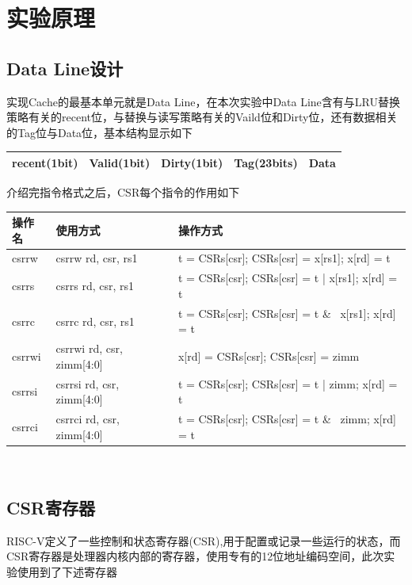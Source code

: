 
\section{实验原理}
\subsection{Data Line设计}
实现Cache的最基本单元就是Data Line，在本次实验中Data Line含有与LRU替换策略有关的recent位，与替换与读写策略有关的Vaild位和Dirty位，还有数据相关的Tag位与Data位，基本结构显示如下\\

\begin{tabular}{|c|c|c|c|c|}
    \hline
    recent(1bit) & Valid(1bit) & Dirty(1bit) & Tag(23bits) & Data \\
    \hline
\end{tabular}

介绍完指令格式之后，CSR每个指令的作用如下\\

\begin{tabular}{|l|l|l|}
    \hline
    操作名 & 使用方式 & 操作方式\\
    \hline
    csrrw & csrrw rd, csr, rs1 & t = CSRs[csr]; CSRs[csr] = x[rs1]; x[rd] = t \\
    \hline
    csrrs & csrrs rd, csr, rs1 & t = CSRs[csr]; CSRs[csr] = t | x[rs1]; x[rd] = t \\
    \hline
    csrrc & csrrc rd, csr, rs1  & t = CSRs[csr]; CSRs[csr] = t \& ~x[rs1]; x[rd] = t \\
    \hline
    csrrwi & csrrwi rd, csr, zimm[4:0] & x[rd] = CSRs[csr]; CSRs[csr] = zimm \\
    \hline
    csrrsi & csrrsi rd, csr, zimm[4:0] & t = CSRs[csr]; CSRs[csr] = t | zimm; x[rd] = t \\
    \hline 
    csrrci & csrrci rd, csr, zimm[4:0] & t = CSRs[csr]; CSRs[csr] = t \& ~zimm; x[rd] = t \\
    \hline
\end{tabular} \\

\subsection{CSR寄存器}
RISC-V定义了一些控制和状态寄存器(CSR),用于配置或记录一些运行的状态，而CSR寄存器是处理器内核内部的寄存器，使用专有的12位地址编码空间，此次实验使用到了下述寄存器

